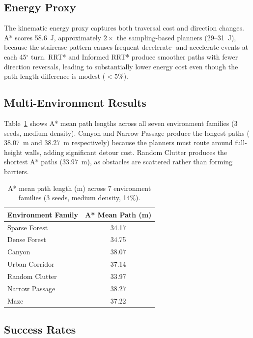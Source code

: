 \documentclass[10pt,twocolumn]{article}
\begin{document}
\subsection{Energy Proxy}

The kinematic energy proxy captures both traversal cost and direction
changes.
A* scores 58.6~J, approximately $2\times$ the sampling-based planners
(29--31~J), because the staircase pattern causes frequent decelerate-
and-accelerate events at each 45$^\circ$ turn.
RRT* and Informed RRT* produce smoother paths with fewer
direction reversals, leading to substantially lower energy cost even
though the path length difference is modest ($<5\%$).

\subsection{Multi-Environment Results}

Table~\ref{tab:multi_env} shows A* mean path lengths across all seven
environment families (3 seeds, medium density).
Canyon and Narrow Passage produce the longest paths ($38.07$~m and
$38.27$~m respectively) because the planners must route around
full-height walls, adding significant detour cost.
Random Clutter produces the shortest A* paths ($33.97$~m), as obstacles
are scattered rather than forming barriers.

\begin{table}[t]
\centering
\caption{A* mean path length (m) across 7 environment families
  (3 seeds, medium density, 14\%).}
\label{tab:multi_env}
\small
\begin{tabular}{lc}
\toprule
Environment Family & A* Mean Path (m) \\
\midrule
Sparse Forest   & 34.17 \\
Dense Forest    & 34.75 \\
Canyon          & 38.07 \\
Urban Corridor  & 37.14 \\
Random Clutter  & 33.97 \\
Narrow Passage  & 38.27 \\
Maze            & 37.22 \\
\bottomrule
\end{tabular}
\end{table}

\subsection{Success Rates}
\end{document}
